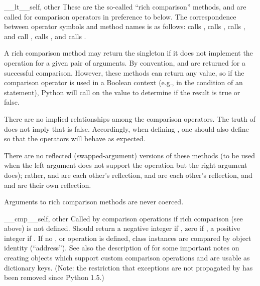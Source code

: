 \begin{methoddesc}[object]{__lt__}{self, other}
These are the so-called ``rich comparison'' methods, and are called
for comparison operators in preference to  below.
The correspondence between operator symbols and method names is as
follows:
 calls ,
 calls ,
 calls ,
 and  call
,
 calls , and
 calls .

A rich comparison method may return the singleton  if it
does not implement the operation for a given pair of arguments.
By convention,  and  are returned for a successful
comparison. However, these methods can return any value, so if the
comparison operator is used in a Boolean context (e.g., in the condition
of an  statement), Python will call  on the
value to determine if the result is true or false.

There are no implied relationships among the comparison operators.
The truth of  does not imply that 
is false.  Accordingly, when defining , one should also
define  so that the operators will behave as expected.

There are no reflected (swapped-argument) versions of these methods
(to be used when the left argument does not support the operation but
the right argument does); rather,  and
 are each other's reflection,  and
 are each other's reflection, and 
and  are their own reflection.

Arguments to rich comparison methods are never coerced.
\end{methoddesc}

\begin{methoddesc}[object]{__cmp__}{self, other}
Called by comparison operations if rich comparison (see above) is not
defined.  Should return a negative integer if ,
zero if , a positive integer if .  If no ,  or
 operation is defined, class instances are compared
by object identity (``address'').  See also the description of
 for some important notes on creating objects which
support custom comparison operations and are usable as dictionary
keys.
(Note: the restriction that exceptions are not propagated by
 has been removed since Python 1.5.)
\end{methoddesc}

